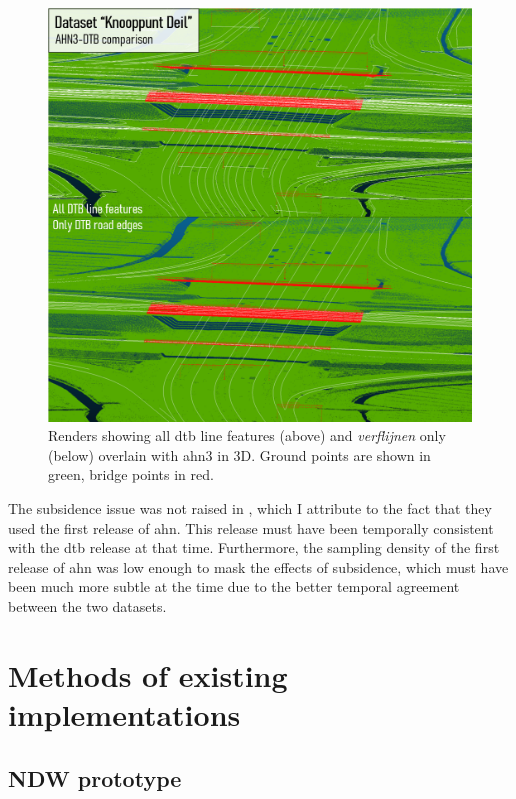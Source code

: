 \begin{figure}
    \centering
    \includegraphics[width=0.9\linewidth]{final_report/figs/ahn_sample_10.png} 
    \caption[Renders comparing AHN3 with DTB lines]{Renders showing all \ac{dtb} line features (above) and \textit{verflijnen} only (below) overlain with \ac{ahn3} in 3D. Ground points are shown in green, bridge points in red.}
    \label{fig:dtbahn}
\end{figure}

The subsidence issue was not raised in \cite{oudeElberink_vosselman_2012}, which I attribute to the fact that they used the first release of \ac{ahn}. This release must have been temporally consistent with the \ac{dtb} release at that time. Furthermore, the sampling density of the first release of \ac{ahn} was low enough to mask the effects of subsidence, which must have been much more subtle at the time due to the better temporal agreement between the two datasets.

\section{Methods of existing implementations}
\label{sec:methodsexisting}

\subsection{NDW prototype}
\label{sub:ndwprototype}

